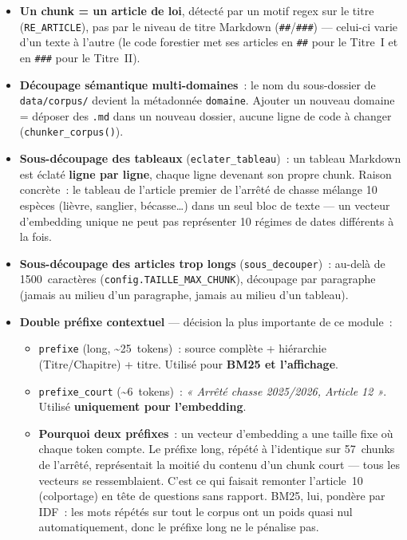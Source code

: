 \documentclass[11pt]{article}
\begin{document}
\begin{itemize}
  \item \textbf{Un chunk = un article de loi}, détecté par un motif regex sur le titre
        (\texttt{RE\_ARTICLE}), pas par le niveau de titre Markdown (\texttt{\#\#}/\texttt{\#\#\#})
        --- celui-ci varie d'un texte à l'autre (le code forestier met ses articles en
        \texttt{\#\#} pour le Titre~I et en \texttt{\#\#\#} pour le Titre~II).

  \item \textbf{Découpage sémantique multi-domaines}~: le nom du sous-dossier de
        \texttt{data/corpus/} devient la métadonnée \texttt{domaine}. Ajouter un nouveau domaine
        = déposer des \texttt{.md} dans un nouveau dossier, aucune ligne de code à changer
        (\texttt{chunker\_corpus()}).

  \item \textbf{Sous-découpage des tableaux} (\texttt{eclater\_tableau})~: un tableau Markdown
        est éclaté \textbf{ligne par ligne}, chaque ligne devenant son propre chunk. Raison
        concrète~: le tableau de l'article premier de l'arrêté de chasse mélange 10 espèces
        (lièvre, sanglier, bécasse\ldots) dans un seul bloc de texte --- un vecteur d'embedding
        unique ne peut pas représenter 10 régimes de dates différents à la fois.

  \item \textbf{Sous-découpage des articles trop longs} (\texttt{sous\_decouper})~: au-delà de
        1500~caractères (\texttt{config.TAILLE\_MAX\_CHUNK}), découpage par paragraphe (jamais au
        milieu d'un paragraphe, jamais au milieu d'un tableau).

  \item \textbf{Double préfixe contextuel} --- décision la plus importante de ce module~:
        \begin{itemize}
          \item \texttt{prefixe} (long, \textasciitilde25~tokens)~: source complète + hiérarchie
                (Titre/Chapitre) + titre. Utilisé pour \textbf{BM25 et l'affichage}.
          \item \texttt{prefixe\_court} (\textasciitilde6~tokens)~: \textit{« Arrêté chasse
                2025/2026, Article 12 »}. Utilisé \textbf{uniquement pour l'embedding}.
          \item \textbf{Pourquoi deux préfixes}~: un vecteur d'embedding a une taille fixe où
                chaque token compte. Le préfixe long, répété à l'identique sur 57~chunks de
                l'arrêté, représentait la moitié du contenu d'un chunk court --- tous les vecteurs
                se ressemblaient. C'est ce qui faisait remonter l'article~10 (colportage) en tête
                de questions sans rapport. BM25, lui, pondère par IDF~: les mots répétés sur tout
                le corpus ont un poids quasi nul automatiquement, donc le préfixe long ne le
                pénalise pas.
        \end{itemize}


\end{itemize}
\end{document}
